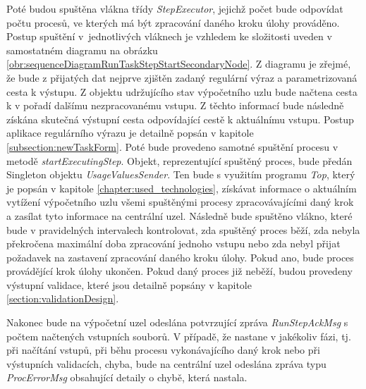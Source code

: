 Poté budou spuštěna vlákna třídy \textit{StepExecutor}, jejichž počet bude odpovídat počtu procesů, ve kterých má být zpracování daného kroku úlohy prováděno. Postup spuštění v~jednotlivých vláknech je vzhledem ke složitosti uveden v samostatném diagramu na obrázku \ref{obr:sequenceDiagramRunTaskStepStartSecondaryNode}. Z diagramu je zřejmé, že bude z přijatých dat nejprve zjištěn zadaný regulární výraz a parametrizovaná cesta k výstupu. Z objektu udržujícího stav výpočetního uzlu bude načtena cesta k v pořadí dalšímu nezpracovanému vstupu. Z těchto informací bude následně získána skutečná výstupní cesta odpovídající cestě k aktuálnímu vstupu. Postup aplikace regulárního výrazu je detailně popsán v kapitole \ref{subsection:newTaskForm}. Poté bude provedeno samotné spuštění procesu v metodě \textit{startExecutingStep}. Objekt, reprezentující spuštěný proces, bude předán Singleton objektu \textit{UsageValuesSender}. Ten bude s využitím programu \textit{Top}, který je popsán v kapitole \ref{chapter:used_technologies}, získávat informace o aktuálním vytížení výpočetního uzlu všemi spuštěnými procesy zpracovávajícími daný krok a zasílat tyto informace na centrální uzel. Následně bude spuštěno vlákno, které bude v pravidelných intervalech kontrolovat, zda spuštěný proces běží, zda nebyla překročena maximální doba zpracování jednoho vstupu nebo zda nebyl přijat požadavek na zastavení zpracování daného kroku úlohy. Pokud ano, bude proces provádějící krok úlohy ukončen. Pokud daný proces již neběží, budou provedeny výstupní validace, které jsou detailně popsány v kapitole \ref{section:validationDesign}.

Nakonec bude na výpočetní uzel odeslána potvrzující zpráva \textit{RunStepAckMsg} s počtem načtených vstupních souborů. V případě, že nastane v jakékoliv fázi, tj. při načítání vstupů, při běhu procesu vykonávajícího daný krok nebo při výstupních validacích, chyba, bude na centrální uzel odeslána zpráva typu \textit{ProcErrorMsg} obsahující detaily o chybě, která nastala.

